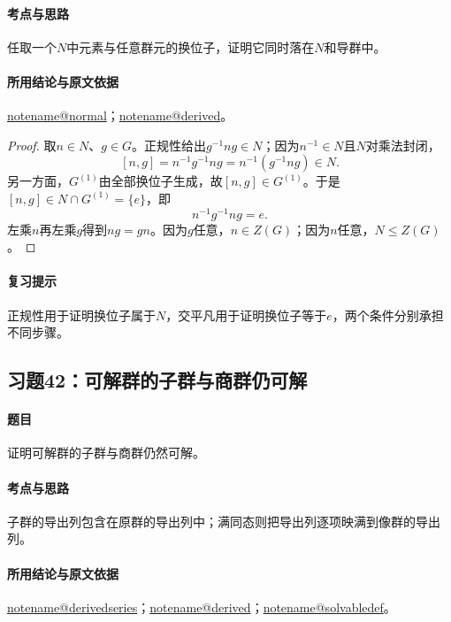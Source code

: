 \documentclass[UTF8,a4paper,11pt,fontset=windows]{ctexart}
\makeatletter
\newcommand{\noteref}[1]{\hyperref[note:#1]{\csname notename@#1\endcsname}}
\newcommand{\exref}[2]{\hyperref[ex:#1:#2]{第#1章习题#2}}
\makeatother
\begin{document}
\paragraph{考点与思路}
任取一个$N$中元素与任意群元的换位子，证明它同时落在$N$和导群中。

\paragraph{所用结论与原文依据}
\noteref{normal}；\noteref{derived}。


\begin{proof}
取$n\in N$、$g\in G$。正规性给出$g^{-1}ng\in N$；因为$n^{-1}\in N$且$N$对乘法封闭，
\[
[n,g]=n^{-1}g^{-1}ng=n^{-1}(g^{-1}ng)\in N.
\]
另一方面，$G^{(1)}$由全部换位子生成，故$[n,g]\in G^{(1)}$。于是$[n,g]\in N\cap G^{(1)}=\{e\}$，即
\[
n^{-1}g^{-1}ng=e.
\]
左乘$n$再左乘$g$得到$ng=gn$。因为$g$任意，$n\in Z(G)$；因为$n$任意，$N\le Z(G)$。
\end{proof}

\paragraph{复习提示}
正规性用于证明换位子属于$N$，交平凡用于证明换位子等于$e$，两个条件分别承担不同步骤。


\subsection{习题42：\texorpdfstring{可解群的子群与商群仍可解}{可解群的子群与商群仍可解}}
\label{ex:2:42}

\paragraph{题目}
证明可解群的子群与商群仍然可解。

\paragraph{考点与思路}
子群的导出列包含在原群的导出列中；满同态则把导出列逐项映满到像群的导出列。

\paragraph{所用结论与原文依据}
\noteref{derivedseries}；\noteref{derived}；\noteref{solvabledef}。
\end{document}
